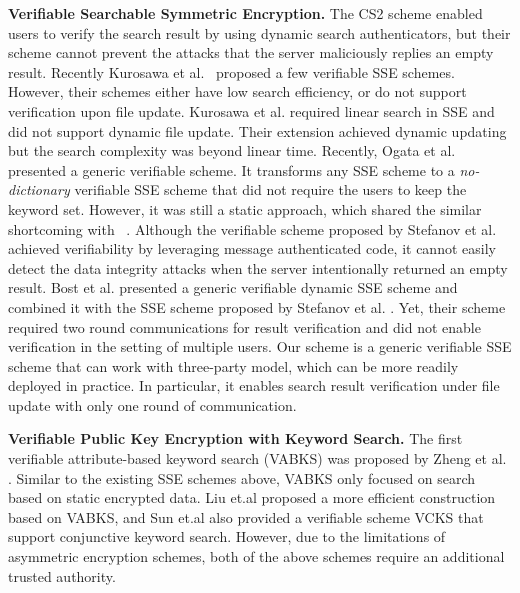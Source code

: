   \noindent\textbf{Verifiable Searchable Symmetric Encryption.} The CS2 scheme \cite{kamara2011cs2} enabled users to verify the search result by using dynamic search authenticators, but their scheme cannot prevent the attacks that the server maliciously replies an empty result.
  Recently Kurosawa et al.~\cite{kurosawa2012uc,kurosawa2013update,ogataefficient} proposed a few verifiable SSE schemes. However, their schemes either have low search efficiency, or do not support verification upon file update.
  Kurosawa et al. \cite{kurosawa2012uc} required linear search in SSE and did not support dynamic file update. Their extension \cite{kurosawa2013update} achieved dynamic updating but the search complexity was beyond linear time. Recently, Ogata et al. \cite{ogataefficient} presented a generic verifiable scheme. It transforms any SSE scheme to a \textit{no-dictionary} verifiable SSE scheme that did not require the users to keep the keyword set. However, it was still a static approach, which shared the similar shortcoming with~\cite{chai2012verifiable} \cite{cheng2015verifiable}.
  Although the verifiable scheme proposed by Stefanov et al.\cite{stefanov2014practical} achieved verifiability by leveraging message authenticated code, it cannot easily detect the data integrity attacks when the server intentionally returned an empty result.
  Bost et al. \cite{bost2016verifiable} presented a generic verifiable dynamic SSE scheme and combined it with the SSE scheme proposed by Stefanov et al. \cite{stefanov2014practical}.
  Yet, their scheme required two round communications for result verification and did not enable verification in the setting of multiple users. Our %
	scheme is a generic verifiable SSE scheme that can work with three-party model, which can be more readily deployed in practice. In particular, it enables search result verification under file update with only one round of communication.


  \noindent\textbf{Verifiable Public Key Encryption with Keyword Search.} The first verifiable attribute-based keyword search (VABKS) was proposed by Zheng et al. \cite{zheng2014vabks}. Similar to the existing SSE schemes above, VABKS only focused on search based on static encrypted data. Liu et.al \cite{liu2014efficient} proposed a more efficient construction based on VABKS, and Sun et.al \cite{sun2015catch} also provided a verifiable scheme VCKS that support conjunctive keyword search. However, due to the limitations of asymmetric encryption schemes, both of the above schemes require an additional trusted authority.


